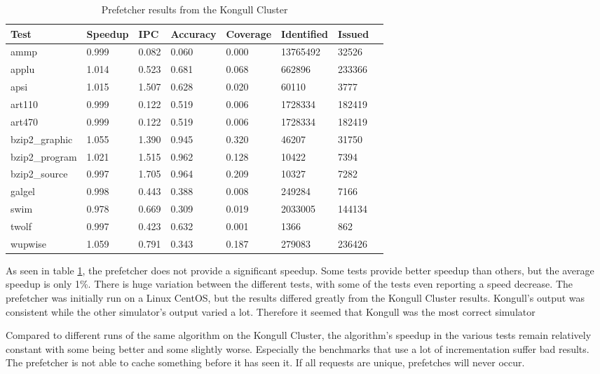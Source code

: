 

\begin{table}[!t]
\renewcommand{\arraystretch}{1.3}
\caption{Prefetcher results from the Kongull Cluster}
\label{table:results}
\centering
\begin{tabular}{|l|l|l|l|l|l|l|l|}
\hline
\bfseries Test & \bfseries Speedup & \bfseries IPC & \bfseries Accuracy & \bfseries Coverage & \bfseries Identified & \bfseries Issued\\
\hline
\hline
ammp 		& 0.999 & 0.082 & 0.060 & 0.000 & 13765492 & 32526\\
applu 		& 1.014 & 0.523 & 0.681 & 0.068 & 662896   & 233366\\
apsi 		& 1.015 & 1.507 & 0.628 & 0.020 & 60110    & 3777\\	
art110 		& 0.999 & 0.122 & 0.519 & 0.006 & 1728334  & 182419\\	
art470 		& 0.999 & 0.122 & 0.519 & 0.006 & 1728334  & 182419\\
bzip2\_graphic 	& 1.055 & 1.390 & 0.945 & 0.320 & 46207    & 31750\\
bzip2\_program 	& 1.021 & 1.515 & 0.962 & 0.128 & 10422    & 7394\\
bzip2\_source 	& 0.997 & 1.705 & 0.964 & 0.209 & 10327    & 7282\\
galgel 		& 0.998 & 0.443 & 0.388 & 0.008 & 249284   & 7166\\
swim 		& 0.978 & 0.669 & 0.309 & 0.019 & 2033005  & 144134\\
twolf 		& 0.997 & 0.423 & 0.632 & 0.001 & 1366 	   & 862	\\
wupwise 	& 1.059 & 0.791 & 0.343 & 0.187 & 279083   & 236426\\
\hline
\end{tabular}
\end{table}

As seen in table \ref{table:results}, the prefetcher does not provide a significant speedup. Some tests provide better speedup than others, but the average speedup is only 1\%. There is huge variation between the different tests, with some of the tests even reporting a speed decrease. The prefetcher was initially run on a Linux CentOS, but the results differed greatly from the Kongull Cluster results. Kongull's output was consistent while the other simulator's output varied a lot. Therefore it seemed that Kongull was the most correct simulator

Compared to different runs of the same algorithm on the Kongull Cluster, the algorithm's speedup in the various tests remain relatively constant with some being better and some slightly worse. Especially the benchmarks that use a lot of incrementation suffer bad results. The prefetcher is not able to cache something before it has seen it. If all requests are unique, prefetches will never occur.

